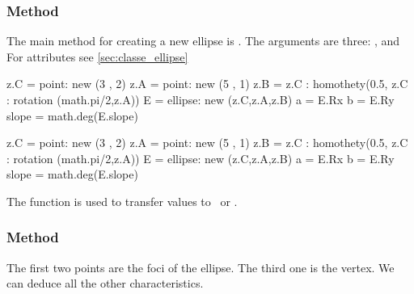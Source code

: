 \subsubsection{Method } %
\label{ssub:method_imeth_ellipse_new}
The main method for creating a new ellipse is . The arguments are three: ,  and 
For attributes see  \ref{sec:classe_ellipse}

\begin{minipage}{0.5\textwidth}
\begin{tkzexample}[latex=0cm,small,code only]
\begin{tkzelements}
   z.C      = point: new (3 , 2)
   z.A      = point: new (5 , 1)
   z.B      = z.C : homothety(0.5,
              z.C : rotation (math.pi/2,z.A))
   E        = ellipse: new (z.C,z.A,z.B)
   a        = E.Rx
   b        = E.Ry
   slope = math.deg(E.slope)
\end{tkzelements}
\end{tkzexample}
\end{minipage}
\begin{minipage}{0.5\textwidth}
\begin{tkzelements}
z.C    = point: new (3 , 2)
z.A    = point: new (5 , 1)
z.B    = z.C : homothety(0.5,
         z.C : rotation (math.pi/2,z.A))
E     = ellipse: new (z.C,z.A,z.B)
a     = E.Rx
b     = E.Ry
slope = math.deg(E.slope)
\end{tkzelements}
\end{minipage}

The function  is used to transfer values to \TIKZ\ or .


\subsubsection{Method } %
\label{ssub:function_tkzname_ellipse__foci}
The first two points are the foci of the ellipse. The third one is the vertex. We can deduce all the other characteristics.

